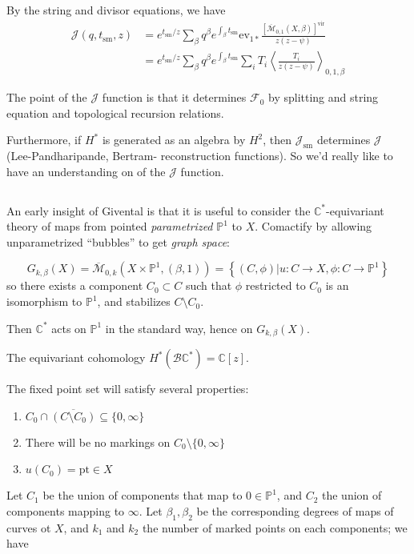 \documentclass{amsart}
\theoremstyle{definition}
\newcommand{\proj}{\mathbb{P}}
\newcommand{\J}{\mathcal{J}}
\newcommand{\sm}{\text{sm}}
\newcommand{\Mbar}{\overline{\mathcal{M}}}
\newcommand{\C}{\mathbb{C}}
\newcommand{\ev}{\text{ev}}
\newcommand{\vir}{\text{vir}}
\begin{document}
By the string and divisor equations, we have
\begin{align*}
\J(q,t_\sm,z)&=
e^{t_\sm/z}\sum_\beta q^\beta e^{\int_\beta t_\sm} \ev_{1*} \frac{[\Mbar_{0,1}(X,\beta)]^\vir}{z(z-\psi)} \\
&=e^{t_\sm/z}\sum_\beta q^\beta e^{\int_\beta t_\sm} \sum_i T_i\left\langle \frac{T_i}{z(z-\psi)}\right\rangle_{0,1,\beta}
\end{align*}

The point of the $\J$ function is that it determines $\mathcal{F}_0$ by splitting and string equation and topological recursion relations.

Furthermore, if $H^*$ is generated as an algebra by $H^2$, then $\J_\sm$ determines $\J$ (Lee-Pandharipande, Bertram- reconstruction functions).  So we'd really like to have an understanding on of the $\J$ function.

\subsection{}
An early insight of Givental is that it is useful to consider the $\C^*$-equivariant theory of maps from pointed \emph{parametrized} $\proj^1$ to $X$.  Comactify by allowing unparametrized ``bubbles'' to get \emph{graph space}:

$$G_{k,\beta}(X)=\Mbar_{0,k}\left(X\times \proj^1,(\beta,1)\right)
=\left\{(C,\phi)|u:C\to X, \phi:C\to\proj^1\right\}$$
so there exists a component $C_0\subset C$ such that $\phi$ restricted to $C_0$ is an isomorphism to $\proj^1$, and stabilizes $C\setminus C_0$.

Then $\C^*$ acts on $\proj^1$ in the standard way, hence on $G_{k,\beta}(X)$.

The equivariant cohomology $H^*(\mathcal{B}\C^*)=\C[z]$.

The fixed point set will satisfy several properties:

\begin{enumerate}
\item  $C_0\cap \overline{(C\setminus C_0)}\subseteq\{0,\infty\}$
\item There will be no markings on $C_0\setminus \{0,\infty\}$
\item $u(C_0)=\text{pt}\in X$
\end{enumerate}


Let $C_1$ be the union of components that map to $0\in\proj^1$, and $C_2$ the union of components mapping to $\infty$.  Let $\beta_1,\beta_2$ be the corresponding degrees of maps of curves ot $X$, and $k_1$ and $k_2$ the number of marked points on each components; we have
\end{document}
